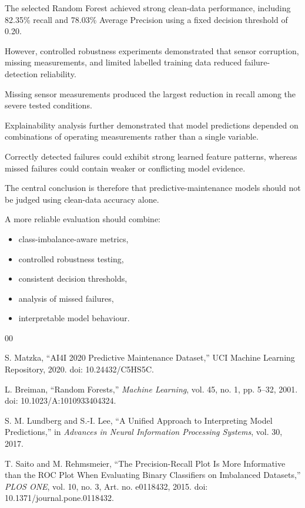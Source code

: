 \documentclass[conference]{IEEEtran}
\begin{document}
The selected Random Forest achieved strong clean-data performance, including 82.35\% recall and 78.03\% Average Precision using a fixed decision threshold of 0.20.

However, controlled robustness experiments demonstrated that sensor corruption, missing measurements, and limited labelled training data reduced failure-detection reliability.

Missing sensor measurements produced the largest reduction in recall among the severe tested conditions.

Explainability analysis further demonstrated that model predictions depended on combinations of operating measurements rather than a single variable.

Correctly detected failures could exhibit strong learned feature patterns, whereas missed failures could contain weaker or conflicting model evidence.

The central conclusion is therefore that predictive-maintenance models should not be judged using clean-data accuracy alone.

A more reliable evaluation should combine:

\begin{itemize}

    \item class-imbalance-aware metrics,
    \item controlled robustness testing,
    \item consistent decision thresholds,
    \item analysis of missed failures,
    \item interpretable model behaviour.

\end{itemize}


\begin{thebibliography}{00}

S. Matzka,
``AI4I 2020 Predictive Maintenance Dataset,''
UCI Machine Learning Repository, 2020.
doi: 10.24432/C5HS5C.

L. Breiman,
``Random Forests,''
\textit{Machine Learning},
vol. 45, no. 1,
pp. 5--32,
2001.
doi: 10.1023/A:1010933404324.

S. M. Lundberg and S.-I. Lee,
``A Unified Approach to Interpreting Model Predictions,''
in \textit{Advances in Neural Information Processing Systems},
vol. 30,
2017.

T. Saito and M. Rehmsmeier,
``The Precision-Recall Plot Is More Informative than the ROC Plot When Evaluating Binary Classifiers on Imbalanced Datasets,''
\textit{PLOS ONE},
vol. 10,
no. 3,
Art. no. e0118432,
2015.
doi: 10.1371/journal.pone.0118432.

\end{thebibliography}
\end{document}
